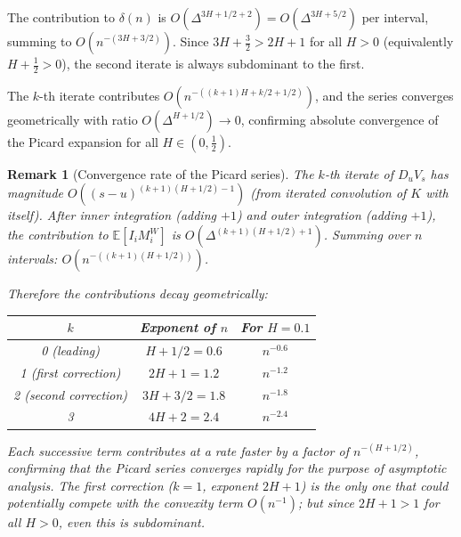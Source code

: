 \documentclass[12pt]{article}
\newtheorem{remark}{Remark}
\theoremstyle{definition}
\newcommand{\E}{\mathbb{E}}
\begin{document}
The contribution to $\delta(n)$ is
$O(\Delta^{3H+1/2+2}) = O(\Delta^{3H+5/2})$ per interval,
summing to $O(n^{-(3H+3/2)})$.
Since $3H + \tfrac32 > 2H + 1$ for all $H > 0$
(equivalently $H + \tfrac12 > 0$), the second iterate is always
subdominant to the first.

The $k$-th iterate contributes $O(n^{-((k+1)H + k/2 + 1/2)})$,
and the series converges geometrically with ratio
$O(\Delta^{H+1/2}) \to 0$, confirming absolute convergence
of the Picard expansion for all $H \in (0,\tfrac12)$.

\begin{remark}[Convergence rate of the Picard series]
The $k$-th iterate of $D_u V_s$ has magnitude
$O((s{-}u)^{(k+1)(H+1/2) - 1})$ (from iterated convolution of $K$
with itself). After inner integration (adding $+1$) and outer
integration (adding $+1$), the contribution to $\E[I_i M_i^W]$ is
$O(\Delta^{(k+1)(H+1/2)+1})$. Summing over $n$ intervals:
$O(n^{-((k+1)(H+1/2))})$.

Therefore the contributions decay geometrically:
\begin{center}
\begin{tabular}{ccc}
\toprule
$k$ & Exponent of $n$ & For $H = 0.1$ \\
\midrule
0 (leading) & $H + 1/2 = 0.6$ & $n^{-0.6}$ \\
1 (first correction) & $2H + 1 = 1.2$ & $n^{-1.2}$ \\
2 (second correction) & $3H + 3/2 = 1.8$ & $n^{-1.8}$ \\
3 & $4H + 2 = 2.4$ & $n^{-2.4}$ \\
\bottomrule
\end{tabular}
\end{center}
Each successive term contributes at a rate faster by a factor of
$n^{-(H+1/2)}$, confirming that the Picard series converges
rapidly for the purpose of asymptotic analysis.
The first correction ($k = 1$, exponent $2H + 1$) is the only one
that could potentially compete with the convexity term $O(n^{-1})$;
but since $2H + 1 > 1$ for all $H > 0$, even this is subdominant.
\end{remark}
\end{document}

